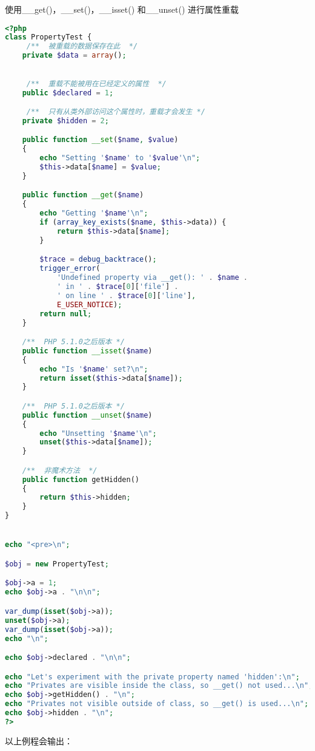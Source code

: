 \begin{example}
使用\_\_get()，\_\_set()，\_\_isset() 和\_\_unset() 进行属性重载
\begin{lstlisting}[language=PHP]
<?php
class PropertyTest {
     /**  被重载的数据保存在此  */
    private $data = array();

 
     /**  重载不能被用在已经定义的属性  */
    public $declared = 1;

     /**  只有从类外部访问这个属性时，重载才会发生 */
    private $hidden = 2;

    public function __set($name, $value) 
    {
        echo "Setting '$name' to '$value'\n";
        $this->data[$name] = $value;
    }

    public function __get($name) 
    {
        echo "Getting '$name'\n";
        if (array_key_exists($name, $this->data)) {
            return $this->data[$name];
        }

        $trace = debug_backtrace();
        trigger_error(
            'Undefined property via __get(): ' . $name .
            ' in ' . $trace[0]['file'] .
            ' on line ' . $trace[0]['line'],
            E_USER_NOTICE);
        return null;
    }

    /**  PHP 5.1.0之后版本 */
    public function __isset($name) 
    {
        echo "Is '$name' set?\n";
        return isset($this->data[$name]);
    }

    /**  PHP 5.1.0之后版本 */
    public function __unset($name) 
    {
        echo "Unsetting '$name'\n";
        unset($this->data[$name]);
    }

    /**  非魔术方法  */
    public function getHidden() 
    {
        return $this->hidden;
    }
}


echo "<pre>\n";

$obj = new PropertyTest;

$obj->a = 1;
echo $obj->a . "\n\n";

var_dump(isset($obj->a));
unset($obj->a);
var_dump(isset($obj->a));
echo "\n";

echo $obj->declared . "\n\n";

echo "Let's experiment with the private property named 'hidden':\n";
echo "Privates are visible inside the class, so __get() not used...\n";
echo $obj->getHidden() . "\n";
echo "Privates not visible outside of class, so __get() is used...\n";
echo $obj->hidden . "\n";
?>
\end{lstlisting}
\end{example}

以上例程会输出：

